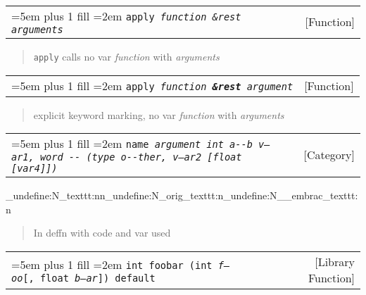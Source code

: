 \documentclass{book}
\newcommand\GNUTexinfocommandstyletextvar[1]{{\normalfont{}\textsl{#1}}}%
\begin{document}
\noindent\begin{tabularx}{\linewidth}{@{}Xr}
\rightskip=5em plus 1 fill
\hangindent=2em
\noindent\texttt{apply \EmbracOn{}\textnormal{\textsl{function \&rest arguments}}\EmbracOff{}}& [Function]
\end{tabularx}

%
\begin{quote}
\unskip{\parskip=0pt\noindent}%
\texttt{apply} calls no var \GNUTexinfocommandstyletextvar{function} with \GNUTexinfocommandstyletextvar{arguments}
\end{quote}


\noindent\begin{tabularx}{\linewidth}{@{}Xr}
\rightskip=5em plus 1 fill
\hangindent=2em
\noindent\texttt{apply \EmbracOn{}\textnormal{\textsl{function \EmbracOff{}\textnormal{\textbf{\&rest}}\EmbracOn{} argument}}\EmbracOff{}}& [Function]
\end{tabularx}

%
\begin{quote}
\unskip{\parskip=0pt\noindent}%
explicit keyword marking, no var \GNUTexinfocommandstyletextvar{function} with \GNUTexinfocommandstyletextvar{arguments}
\end{quote}


%
\noindent\begin{tabularx}{\linewidth}{@{}Xr}
\rightskip=5em plus 1 fill
\hangindent=2em
\noindent\texttt{name \EmbracOn{}\textnormal{\textsl{argument \texttt{int} \texttt{a{-}{-}b} \GNUTexinfocommandstyletextvar{v--ar1}, word \texttt{{-}{-}} (\texttt{type o{-}{-}ther}, \GNUTexinfocommandstyletextvar{v---ar2}  [\texttt{float} [\GNUTexinfocommandstyletextvar{var4}]])}}\EmbracOff{}}& [Category]
\end{tabularx}
\ExplSyntaxOn%
\cs_undefine:N{\embrac_texttt:nn}\cs_undefine:N{\embrac_orig_texttt:n}\cs_undefine:N{\__embrac_texttt:n}%
\ExplSyntaxOff%

%
\begin{quote}
\unskip{\parskip=0pt\noindent}%
In deffn with code and var used
\end{quote}


\noindent\begin{tabularx}{\linewidth}{@{}Xr}
\rightskip=5em plus 1 fill
\hangindent=2em
\noindent\texttt{int foobar (int\ \GNUTexinfocommandstyletextvar{f---oo}[,\ float\ \GNUTexinfocommandstyletextvar{b--ar}])\ default}& [Library Function]
\end{tabularx}
\end{document}
